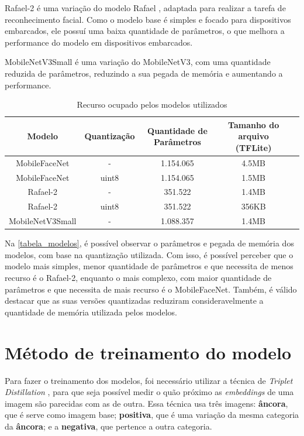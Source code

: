 Rafael-2 é uma variação do modelo Rafael \cite{rafael}, adaptada para realizar a tarefa de reconhecimento facial.
Como o modelo base é simples e focado para dispositivos embarcados, ele possuí uma baixa quantidade de parâmetros,
 o que melhora a performance do modelo em dispositivos embarcados.

MobileNetV3Small é uma variação do MobileNetV3, com uma quantidade reduzida de parâmetros, reduzindo a sua pegada de
memória e aumentando a performance.

\begin{table}[htb]
\centering
\ABNTEXfontereduzida
\caption[Recurso utilizado por modelo]{Recurso ocupado pelos modelos utilizados}
\label{tabela_modelos}
\begin{tabular}{ |c|c|c|c|c| }
	\hline
	\textbf{Modelo} 	& \textbf{Quantização} & \textbf{Quantidade de Parâmetros} & \textbf{Tamanho do arquivo (TFLite)} \\
	\hline
	MobileFaceNet 		& - 	& 1.154.065 & 4.5MB \\
	MobileFaceNet 		& uint8 & 1.154.065 & 1.5MB \\
	Rafael-2 		& - 	& 351.522  & 1.4MB \\
	Rafael-2 		& uint8 & 351.522   & 356KB \\
	MobileNetV3Small 	& - 	& 1.088.357 & 1.4MB \\
	\hline
\end{tabular}
\end{table}

Na \autoref{tabela_modelos}, é possível observar o parâmetros e pegada de memória dos modelos, com base na quantização
utilizada.
Com isso, é possível perceber que o modelo mais simples, menor quantidade de parâmetros e que necessita de menos recurso
é o Rafael-2, enquanto o mais complexo, com maior quantidade de parâmetros e que necessita de mais recurso é o
MobileFaceNet. Também, é válido destacar que as suas versões quantizadas reduziram consideravelmente a quantidade de
memória utilizada pelos modelos.

\section{Método de treinamento do modelo}\label{sec_treinamento_modelo}
Para fazer o treinamento dos modelos, foi necessário utilizar a técnica de \textit{Triplet Distillation}
\cite{triplet_distillation_face_recognition},
para que seja possível medir o quão próximo as \textit{embeddings} de uma imagem são parecidas com as de outra.
Essa técnica usa três imagens: \textbf{âncora}, que é serve como imagem base; \textbf{positiva},
que é uma variação da mesma categoria da \textbf{âncora}; e a \textbf{negativa}, que pertence a outra categoria.

